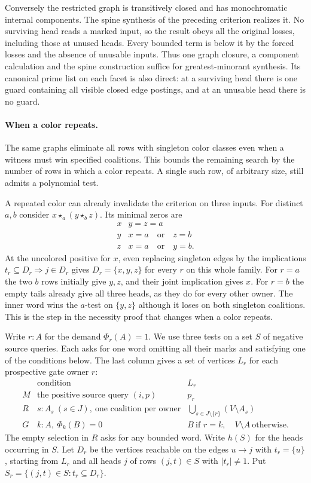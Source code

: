 Conversely the restricted graph is transitively
closed and has monochromatic internal components.
The spine synthesis of the preceding criterion
realizes it. No surviving head reads a marked
input, so the result obeys all the original losses,
including those at unused heads. Every bounded
term is below it by the forced losses and the
absence of unusable inputs. Thus one graph
closure, a component calculation and the spine
construction suffice for greatest-minorant synthesis.
Its canonical prime list on each facet is also
direct: at a surviving head there is one guard
containing all visible closed edge postings, and
at an unusable head there is no guard.

\paragraph{When a color repeats.}
The same graphs eliminate all rows with singleton color classes even
when a witness must win specified coalitions. This bounds the remaining
search by the number of rows in which a color repeats. A single such row,
of arbitrary size, still admits a polynomial test.

A repeated color can already invalidate the criterion on three inputs.
For distinct $a,b$ consider $x\star_a(y\star_b z)$. Its minimal zeros are
\[
\begin{array}{c|l}
 x & y=z=a\\
 y & x=a\quad\text{or}\quad z=b\\
 z & x=a\quad\text{or}\quad y=b .
\end{array}
\]
At the uncolored positive for $x$, even replacing singleton edges by
the implications $t_r\subseteq D_r\Rightarrow j\in D_r$ gives
$D_r=\{x,y,z\}$ for every $r$ on this whole family. For $r=a$ the two
$b$ rows initially give $y,z$, and their joint implication gives $x$.
For $r=b$ the empty tails already give all three heads, as they do for
every other owner. The inner word wins the $a$-test on $\{y,z\}$
although it loses on both singleton coalitions. This is the step
in the necessity proof that changes when a color repeats.

Write $r:A$ for the demand $\Phi_r(A)=1$. We use three tests on a set
$S$ of negative source queries. Each asks for one word omitting all
their marks and satisfying one of the conditions below. The last column
gives a set of vertices $L_r$ for each prospective gate owner $r$:
\[
\begin{array}{c|l|l}
 &\text{condition}&L_r\\ \hline
 M &\text{the positive source query }(i,p)&p_r\\
 R &s:A_s\ (s\in J),\ \text{one coalition per owner}
     &\displaystyle\bigcup_{s\in J\setminus\{r\}}(V\setminus A_s)\\
 G &k:A,\ \Phi_k(B)=0
     &B\ \text{if }r=k,\quad V\setminus A\ \text{otherwise}.
\end{array}
\]
The empty selection in $R$ asks for any bounded word. Write $h(S)$
for the heads occurring in $S$. Let $D_r$ be
the vertices reachable on the edges $u\to j$ with $t_r=\{u\}$,
starting from $L_r$ and all heads $j$ of rows $(j,t)\in S$ with
$|t_r|\ne1$. Put $S_r=\{(j,t)\in S:t_r\subseteq D_r\}$.

